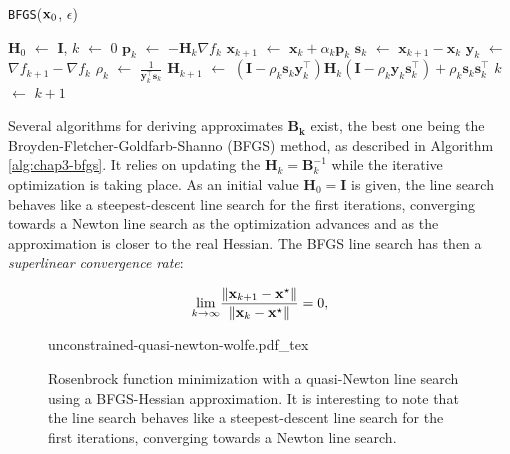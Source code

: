 \begin{algorithm}
\caption{\texttt{BFGS}($\mathbf{x}_0$, $\epsilon$)}
\label{alg:chap3-bfgs}
\begin{algorithmic}
\STATE $\mathbf{H}_0$ $\leftarrow$ $\mathbf{I}$, $k$ $\leftarrow$ $0$
\STATE $\mathbf{p}_k$ $\leftarrow$ $-\mathbf{H}_k\nabla f_k$
\STATE $\mathbf{x}_{k+1}$ $\leftarrow$ $\mathbf{x}_k + \alpha_k\mathbf{p}_k$
\STATE $\mathbf{s}_k$ $\leftarrow$ $\mathbf{x}_{k+1} - \mathbf{x}_k$
\STATE $\mathbf{y}_k$ $\leftarrow$ $\nabla f_{k+1} - \nabla f_k$
\STATE $\rho_k$ $\leftarrow$ $\frac{1}{\mathbf{y}_k^{\top}\mathbf{s}_k}$
\STATE $\mathbf{H}_{k+1}$ $\leftarrow$ $(\mathbf{I}-\rho_k\mathbf{s}_k\mathbf{y}_k^{\top})\mathbf{H}_k(\mathbf{I}-\rho_k\mathbf{y}_k\mathbf{s}_k^{\top})+\rho_k\mathbf{s}_k\mathbf{s}_k^{\top}$
\STATE $k$ $\leftarrow$ $k + 1$
\ENDWHILE
\end{algorithmic}
\end{algorithm}

Several algorithms for deriving approximates $\mathbf{B_k}$ exist, the
best one being the Broyden-Fletcher-Goldfarb-Shanno (BFGS) method, as
described in Algorithm \ref{alg:chap3-bfgs}. It relies on updating the
$\mathbf{H}_k = \mathbf{B}_k^{-1}$ while the iterative optimization is
taking place. As an initial value $\mathbf{H}_0=\mathbf{I}$ is given,
the line search behaves like a steepest-descent line search for the
first iterations, converging towards a Newton line search as the
optimization advances and as the approximation is closer to the real
Hessian. The BFGS line search has then a \emph{superlinear
  convergence rate}:

\begin{equation}
\underset{k\rightarrow\infty}{\text{lim}}
\frac{\left\lVert \mathbf{x}_{k+1}-\mathbf{x}^{\star} \right\rVert}{\left\lVert \mathbf{x}_k-\mathbf{x}^{\star} \right\rVert}
= 0,
\end{equation}

\begin{figure}
  \centering
      {\def\svgwidth{0.8\linewidth}
        {\footnotesize
          
                     {unconstrained-quasi-newton-wolfe.pdf_tex}
        }
      }
      \caption[Quasi-Newton line search.]{Rosenbrock function
        minimization with a quasi-Newton line search using a
        BFGS-Hessian approximation. It is interesting to note that the
        line search behaves like a steepest-descent line search for
        the first iterations, converging towards a Newton line
        search.}
      \label{fig:chap3-unconstrained-quasi-newton-wolfe}
\end{figure}

